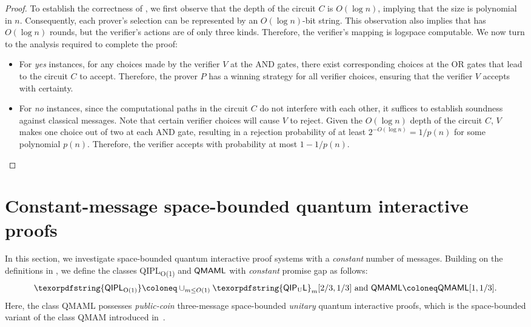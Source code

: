 \documentclass[10pt,a4paper]{article}
\numberwithin{equation}{section}
\numberwithin{figure}{section}
\newcommand{\QMAM}{\textnormal{\textsf{QMAM}}\xspace}
\newcommand{\QMAML}{\textnormal{\textsf{QMAML}}\xspace}
\newcommand{\QIPLconst}{\texorpdfstring{\textnormal{\textsf{QIPL}\textsubscript{O(1)}}}\xspace}
\newcommand{\QIPUL}{\texorpdfstring{\textnormal{\textsf{QIP}\textsubscript{\textnormal{U}}\textsf{L}}}\xspace}
\begin{document}
\begin{proof}
    To establish the correctness of , we first observe that  the depth of the circuit $C$ is $O(\log n)$, implying that the size is polynomial in $n$. Consequently, each prover's selection can be represented by an $O(\log n)$-bit string. 
    This observation also implies that  has $O(\log n)$ rounds, but the verifier's actions are of only three kinds. Therefore, the verifier's mapping is logspace computable. We now turn to the analysis required to complete the proof: 
    \begin{itemize}
        \item For \textit{yes} instances, for any choices made by the verifier $V$ at the AND gates, there exist corresponding choices at the OR gates that lead to the circuit $C$ to accept. Therefore, the prover $P$ has a winning strategy for all verifier choices, ensuring that the verifier $V$ accepts with certainty. 
        \item For \textit{no} instances, since the computational paths in the circuit $C$ do not interfere with each other, it suffices to establish soundness against classical messages. Note that certain verifier choices will cause $V$ to reject. Given the $O(\log n)$ depth of the circuit $C$, $V$ makes one choice out of two at each AND gate, resulting in a rejection probability of at least $2^{-O(\log {n})} = 1/p(n)$ for some polynomial $p(n)$. Therefore, the verifier accepts with probability at most $1-1/p(n)$. \qedhere
    \end{itemize}
\end{proof}

\section{Constant-message space-bounded quantum interactive proofs}
\label{sec:cosnt-message-QIPL}

In this section, we investigate space-bounded quantum interactive proof systems with a \textit{constant} number of messages. Building on the definitions in , we define the classes \QIPLconst{} and $\QMAML$ with \textit{constant} promise gap as follows: 
\begin{equation}
    \label{eq:QIPLconst-defs}
    \QIPLconst \coloneq \cup_{m \leq O(1)} \QIPUL_m[2/3,1/3] \text{ and } \QMAML \coloneq \QMAML[1,1/3].
\end{equation}
Here, the class \QMAML{} possesses \textit{public-coin} three-message space-bounded \textit{unitary} quantum interactive proofs, which is the space-bounded variant of the class \QMAM{} introduced in~\cite{MW05}. 
\end{document}
